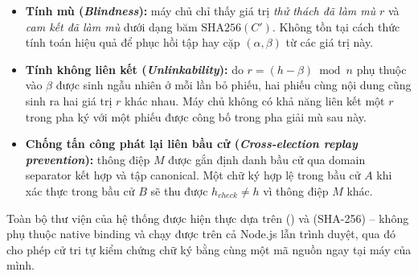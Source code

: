 \begin{itemize}
    \item \textbf{Tính mù (\textit{Blindness}):} máy chủ chỉ thấy giá trị \textit{thử thách đã làm mù} $r$ và \textit{cam kết đã làm mù} dưới dạng băm $\text{SHA256}(C')$. Không tồn tại cách thức tính toán hiệu quả để phục hồi tập  hay cặp $(\alpha, \beta)$ từ các giá trị này.

    \item \textbf{Tính không liên kết (\textit{Unlinkability}):} do $r = (h - \beta) \bmod n$ phụ thuộc vào $\beta$ được sinh ngẫu nhiên ở mỗi lần bỏ phiếu, hai phiếu cùng nội dung cũng sinh ra hai giá trị $r$ khác nhau. Máy chủ không có khả năng liên kết một $r$ trong pha ký với một phiếu được công bố trong pha giải mù sau này.

    \item \textbf{Chống tấn công phát lại liên bầu cử (\textit{Cross-election replay prevention}):} thông điệp $M$ được gắn định danh bầu cử qua domain separator  kết hợp  và tập  canonical. Một chữ ký hợp lệ trong bầu cử $A$ khi xác thực trong bầu cử $B$ sẽ thu được $h_{check} \neq h$ vì thông điệp $M$ khác.
\end{itemize}

Toàn bộ thư viện  của hệ thống được hiện thực dựa trên  () và  (SHA-256) -- không phụ thuộc native binding và chạy được trên cả Node.js lẫn trình duyệt, qua đó cho phép cử tri tự kiểm chứng chữ ký bằng cùng một mã nguồn ngay tại máy của mình.
